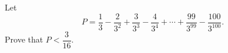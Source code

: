 Let
\[
P=\dfrac{1}{3}-\dfrac{2}{3^2}+\dfrac{3}{3^3}-\dfrac{4}{3^4}+\cdots+\dfrac{99}{3^{99}}-\dfrac{100}{3^{100}}.
\]
Prove that $P<\dfrac{3}{16}$.
